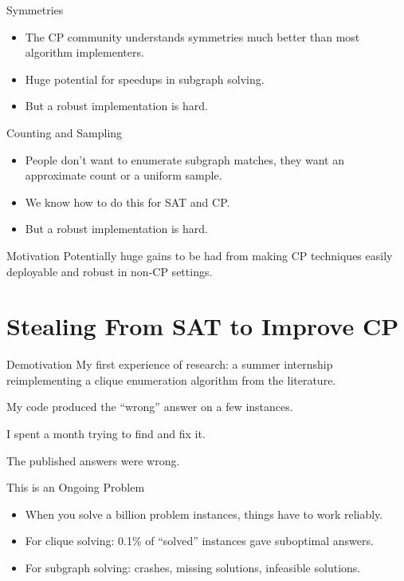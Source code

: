 \documentclass[aspectratio=169,compress,10pt]{beamer}
\begin{document}
\begin{frame}{Symmetries}
    \begin{itemize}
        \item The CP community understands symmetries much better than most algorithm implementers.
        \item Huge potential for speedups in subgraph solving.
        \item <2-> But a robust implementation is hard.
    \end{itemize}
\end{frame}

\begin{frame}{Counting and Sampling}
    \begin{itemize}
        \item People don't want to enumerate subgraph matches, they want an approximate count or
            a uniform sample.
        \item We know how to do this for SAT and CP.
        \item <2-> But a robust implementation is hard.
    \end{itemize}
\end{frame}

\begin{frame}{Motivation}
    Potentially huge gains to be had from making CP techniques easily
    deployable and robust in non-CP settings.
\end{frame}

\section{Stealing From SAT to Improve CP}

\begin{frame}{Demotivation}
    My first experience of research: a summer internship reimplementing a clique enumeration algorithm from the literature.

    \bigskip

    My code produced the ``wrong'' answer on a few instances.

    \bigskip\pause

    I spent a month trying to find and fix it.

    \bigskip\pause

    The published answers were wrong.
\end{frame}

\begin{frame}{This is an Ongoing Problem}
    \begin{itemize}
        \item When you solve a billion problem instances, things have to work reliably.
        \item For clique solving: 0.1\% of ``solved'' instances gave suboptimal answers.
        \item For subgraph solving: crashes, missing solutions, infeasible solutions.
    \end{itemize}
\end{frame}
\end{document}
